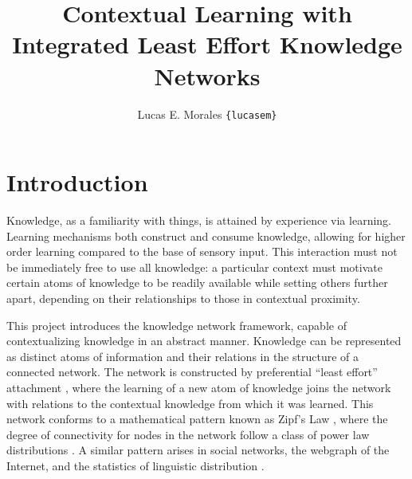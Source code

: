 \documentclass[11pt,letterpaper]{article}
\title{{\Large Contextual Learning with Integrated Least Effort Knowledge Networks}}
\author{Lucas E. Morales \texttt{\{lucasem\}}}
\date{}
\begin{document}
\maketitle

\section{Introduction}

Knowledge, as a familiarity with things, is attained by experience via
learning. Learning mechanisms both construct and consume knowledge, allowing
for higher order learning compared to the base of sensory input. This
interaction must not be immediately free to use all knowledge: a particular
context must motivate certain atoms of knowledge to be readily available
while setting others further apart, depending on their relationships to
those in contextual proximity.

This project introduces the knowledge network framework, capable of
contextualizing knowledge in an abstract manner. Knowledge can be
represented as distinct atoms of information and their relations in the
structure of a connected network. The network is constructed by preferential
``least effort'' attachment \cite{cancho03}, where the learning of a new
atom of knowledge joins the network with relations to the contextual
knowledge from which it was learned. This network conforms to a mathematical
pattern known as Zipf's Law \cite{zipf49}, where the degree of connectivity
for nodes in the network follow a class of power law distributions
\cite{barabasi99}. A similar pattern arises in social networks, the webgraph
of the Internet, and the statistics of linguistic distribution
\cite{clauset09}.

% 
\end{document}
